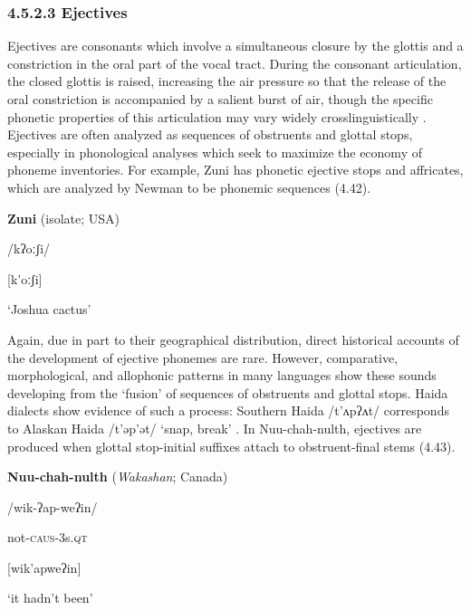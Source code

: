 \subsubsection{\rmfamily\bfseries} 
\subsubsection{\textbf{4.5.2.3} \textbf{Ejectives} }

  Ejectives are consonants which involve a simultaneous closure by the glottis and a constriction in the oral part of the vocal tract. During the consonant articulation, the closed glottis is raised, increasing the air pressure so that the release of the oral constriction is accompanied by a salient burst of air, though the specific phonetic properties of this articulation may vary widely crosslinguistically \citep{Lindau1984}. Ejectives are often analyzed as sequences of obstruents and glottal stops, especially in phonological analyses which seek to maximize the economy of phoneme inventories. For example, Zuni has phonetic ejective stops and affricates, which are analyzed by Newman to be phonemic sequences (4.42).

\ea\label{ex:(4.42)}
  \textbf{Zuni} (isolate; USA)

/kʔoːʃi/

[k’oːʃi]

‘Joshua cactus’

\citep[16]{Newman1965}

\z

  Again, due in part to their geographical distribution, direct historical accounts of the development of ejective phonemes are rare. However, comparative, morphological, and allophonic patterns in many languages show these sounds developing from the ‘fusion’ of sequences of obstruents and glottal stops. Haida dialects show evidence of such a process: Southern Haida /t’ʌpʔʌt/ corresponds to Alaskan Haida /t’əp’ət/ ‘snap, break’ \citep[312]{Fallon2002}. In Nuu-chah-nulth, ejectives are produced when glottal stop-initial suffixes attach to obstruent-final stems (4.43).

\ea\label{ex:(4.43)}
  \textbf{Nuu-chah-nulth} (\textit{Wakashan}; Canada)

/wik{}-ʔap{}-weʔin/

not-\textsc{caus}{}-3s.\textsc{qt}

[wik’apweʔin]

‘it hadn’t been’

\citep[69]{Stonham1999}
\z

